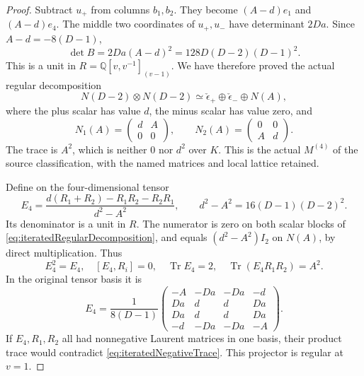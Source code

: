 \begin{proof}
Subtract \(u_+\) from columns \(b_1,b_2\).
They become \((A-d)e_1\) and \((A-d)e_4\).
The middle two coordinates of \(u_+,u_-\) have determinant
\(2Da\). Since \(A-d=-8(D-1)\),
\begin{equation}\label{eq:iteratedRegularDeterminant}
             \det B=2Da(A-d)^2
                    =128D(D-2)(D-1)^2.
\end{equation}
This is a unit in \(R=\mathbb Q[v,v^{-1}]_{(v-1)}\).
We have therefore proved the actual regular decomposition
\begin{equation}\label{eq:iteratedRegularDecomposition}
 N(D-2)\otimes N(D-2)
       \simeq\check\epsilon_+\oplus\check\epsilon_-\oplus N(A),
\end{equation}
where the plus scalar has value \(d\), the minus scalar
has value zero, and
\[
 N_1(A)=\begin{pmatrix}d&A\\0&0\end{pmatrix},\qquad
 N_2(A)=\begin{pmatrix}0&0\\A&d\end{pmatrix}.
\]
The trace is \(A^2\), which is neither \(0\) nor \(d^2\)
over \(K\). This is the actual \(M^{(4)}\) of the source
classification, with the named matrices and local lattice retained.

Define on the four-dimensional tensor
\begin{equation}\label{eq:iteratedMarkedProjector}
 E_4=\frac{d(R_1+R_2)-R_1R_2-R_2R_1}{d^2-A^2},
 \qquad d^2-A^2=16(D-1)(D-2)^2 .
\end{equation}
Its denominator is a unit in \(R\). The numerator is zero
on both scalar blocks of
\eqref{eq:iteratedRegularDecomposition}, and equals
\((d^2-A^2)I_2\) on \(N(A)\), by direct multiplication.
Thus
\[
 E_4^2=E_4,\quad [E_4,R_i]=0,\quad
 \operatorname{Tr}E_4=2,\quad
 \operatorname{Tr}(E_4R_1R_2)=A^2.
\]
In the original tensor basis it is
\[
 E_4=\frac1{8(D-1)}
 \begin{pmatrix}
 -A&-Da&-Da&-d\\
 Da&d&d&Da\\
 Da&d&d&Da\\
 -d&-Da&-Da&-A
 \end{pmatrix}.
\]
If \(E_4,R_1,R_2\) all had nonnegative Laurent matrices in
one basis, their product trace would contradict
\eqref{eq:iteratedNegativeTrace}. This projector is regular
at \(v=1\).


\end{proof}
